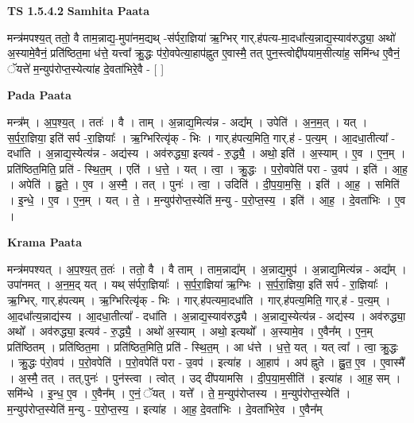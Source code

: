 \documentclass[17pt]{extarticle}
\begin{document}
\textbf{TS 1.5.4.2 } \newline
\textbf{Samhita Paata} \newline

मन्त्र॑मपश्य॒त् ततो॒ वै ताम॒न्नाद्य॒-मुपा॑नम॒द्यथ् -स॑र्परा॒ज्ञिया॑ ऋ॒ग्भिर् गार्.ह॑पत्य-मा॒दधा᳚त्य॒न्नाद्य॒स्याव॑रुद्ध्या॒ अथो॑ अ॒स्यामे॒वैनं॒ प्रति॑ष्ठित॒मा ध॑त्ते॒ यत्त्वा᳚ क्रु॒द्धः प॑रो॒वपेत्या॒हाप॑ह्नुत ए॒वास्मै॒ तत् पुन॒स्त्वोद्दी॑पयाम॒सीत्या॑ह॒ समि॑न्ध ए॒वैनं॒ ॅयत्ते॑ म॒न्युप॑रोप्त॒स्येत्या॑ह दे॒वता॑भिरे॒वै - [ ] \newline

\textbf{Pada Paata} \newline

मन्त्र᳚म् । अ॒प॒श्य॒त् । ततः॑ । वै । ताम् । अ॒न्नाद्य॒मित्य॑न्न - अद्य᳚म् । उपेति॑ । अ॒न॒म॒त् । यत् । स॒र्प॒रा॒ज्ञिया॒ इति॑ सर्प -रा॒ज्ञियाः᳚ । ऋ॒ग्भिरित्यृ॑क् - भिः । गार्.ह॑पत्य॒मिति॒ गार्.ह॑ - प॒त्य॒म् । आ॒दधा॒तीत्या᳚ - दधा॑ति । अ॒न्नाद्य॒स्येत्य॑न्न - अद्य॑स्य । अव॑रुद्ध्या॒ इत्यव॑ - रु॒द्ध्यै॒ । अथो॒ इति॑ । अ॒स्याम् । ए॒व । ए॒न॒म् । प्रति॑ष्ठित॒मिति॒ प्रति॑ - स्थि॒त॒म् । एति॑ । ध॒त्ते॒ । यत् । त्वा॒ । क्रु॒द्धः । प॒रो॒वपेति॑ परा - उ॒वप॑ । इति॑ । आ॒ह॒ । अपेति॑ । ह्नु॒ते॒ । ए॒व । अ॒स्मै॒ । तत् । पुनः॑ । त्वा॒ । उदिति॑ । दी॒प॒या॒म॒सि॒ । इति॑ । आ॒ह॒ । समिति॑ । इ॒न्धे॒ । ए॒व । ए॒न॒म् । यत् । ते॒ । म॒न्युप॑रोप्त॒स्येति॑ म॒न्यु - प॒रो॒प्त॒स्य॒ । इति॑ । आ॒ह॒ । दे॒वता॑भिः । ए॒व ।  \newline


\textbf{Krama Paata} \newline

मन्त्र॑मपश्यत् । अ॒प॒श्य॒त् त॒तः॑ । ततो॒ वै । वै ताम् । ताम॒न्नाद्य᳚म् । अ॒न्नाद्य॒मुप॑ । अ॒न्नाद्य॒मित्य॑न्न - अद्य᳚म् । उपा॑नमत् । अ॒न॒म॒द् यत् । यथ् स॑र्परा॒ज्ञियाः᳚ । स॒र्प॒रा॒ज्ञिया॑ ऋ॒ग्भिः । स॒र्प॒रा॒ज्ञिया॒ इति॑ सर्प - रा॒ज्ञियाः᳚ । ऋ॒ग्भिर्, गार्.ह॑पत्यम् । ऋ॒ग्भिरित्यृ॑क् - भिः । गार्.ह॑पत्यमा॒दधा॑ति । गार्.ह॑पत्य॒मिति॒ गार्.ह॑ - प॒त्य॒म् । आ॒दधा᳚त्य॒न्नाद्य॑स्य । आ॒दधा॒तीत्या᳚ - दधा॑ति । अ॒न्नाद्य॒स्याव॑रुद्ध्यै । अ॒न्नाद्य॒स्येत्य॑न्न - अद्य॑स्य । अव॑रुद्ध्या॒ अथो᳚ । अव॑रुद्ध्या॒ इत्यव॑ - रु॒द्ध्यै॒ । अथो॑ अ॒स्याम् । अथो॒ इत्यथो᳚ । अ॒स्यामे॒व । ए॒वैन᳚म् । ए॒न॒म् प्रति॑ष्ठितम् । प्रति॑ष्ठित॒मा । प्रति॑ष्ठित॒मिति॒ प्रति॑ - स्थि॒त॒म् । आ ध॑त्ते । ध॒त्ते॒ यत् । यत् त्वा᳚ । त्वा॒ क्रु॒द्धः । क्रु॒द्धः प॑रो॒वप॑ । प॒रो॒वपेति॑ । प॒रो॒वपेति॑ परा - उ॒वप॑ । इत्या॑ह । आ॒हाप॑ । अप॑ ह्नुते । ह्नु॒त॒ ए॒व । ए॒वास्मै᳚ । अ॒स्मै॒ तत् । तत्,पुनः॑ । पुन॑स्त्वा । त्वोत् । उद् दी॑पयामसि । दी॒प॒या॒म॒सीति॑ । इत्या॑ह । आ॒ह॒ सम् । समि॑न्धे । इ॒न्ध॒ ए॒व । ए॒वैन᳚म् । ए॒नं॒ ॅयत् । यत्ते᳚ । ते॒ म॒न्युप॑रोप्तस्य । म॒न्युप॑रोप्त॒स्येति॑ । म॒न्युप॑रोप्त॒स्येति॑ म॒न्यु - प॒रो॒प्त॒स्य॒ । इत्या॑ह । आ॒ह॒ दे॒वता॑भिः । दे॒वता॑भिरे॒व । ए॒वैन᳚म् \newline
\end{document}
